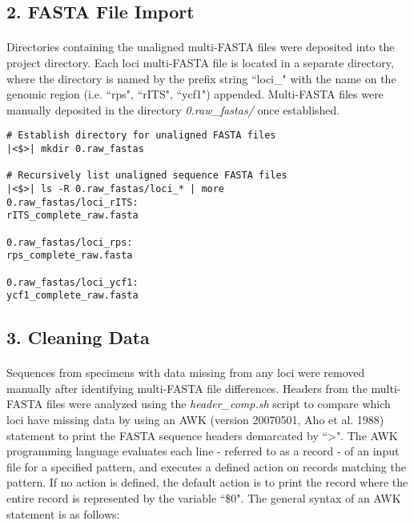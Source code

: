 \vspace*{30pt}

\subsection*{2. FASTA File Import}

\paragraph{} Directories containing the unaligned multi-FASTA files were deposited into the project directory.  Each loci multi-FASTA file is located in a separate directory, where the directory is named by the prefix string ``loci\_" with the name on the genomic region (i.e. ``rps", ``rITS", ``ycf1") appended.  Multi-FASTA files were manually deposited in the directory \textit{0.raw\_fastas/} once established.

\clearpage

\begin{lstlisting}[caption={Unaligned sequence data deposited in \textit{0.raw\_fastas/} subdirectory}]
# Establish directory for unaligned FASTA files 
|<$>| mkdir 0.raw_fastas

# Recursively list unaligned sequence FASTA files
|<$>| ls -R 0.raw_fastas/loci_* | more
0.raw_fastas/loci_rITS:
rITS_complete_raw.fasta

0.raw_fastas/loci_rps:
rps_complete_raw.fasta

0.raw_fastas/loci_ycf1:
ycf1_complete_raw.fasta
\end{lstlisting}

\vspace*{30pt}

\subsection*{3. Cleaning Data}

\paragraph{} Sequences from specimens with data missing from any loci were removed manually after identifying multi-FASTA file differences.  Headers from the multi-FASTA files were analyzed using the \textit{header\_comp.sh} script to compare which loci have missing data by using an AWK (version 20070501, Aho et al. 1988) statement to print the FASTA sequence headers demarcated by ``>".  The AWK programming language evaluates each line - referred to as a record - of an input file for a specified pattern, and executes a defined action on records matching the pattern.  If no action is defined, the default action is to print the record where the entire record is represented by the variable ``\$0".  The general syntax of an AWK statement is as follows:  

